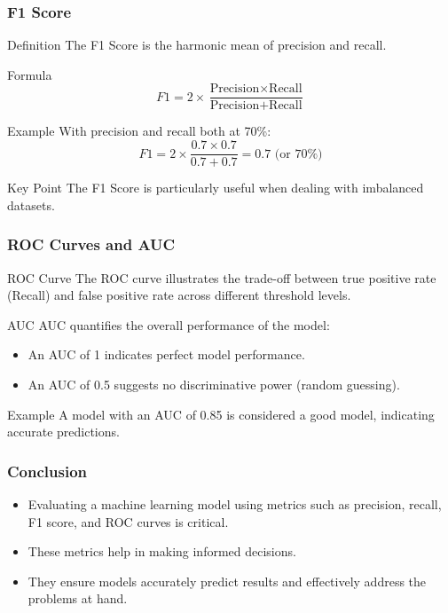 \documentclass[aspectratio=169]{beamer}
\begin{document}
\begin{frame}[fragile]
    \frametitle{F1 Score}
    \begin{block}{Definition}
        The F1 Score is the harmonic mean of precision and recall.
    \end{block}
    \begin{block}{Formula}
        \begin{equation}
            F1 = 2 \times \frac{\text{Precision} \times \text{Recall}}{\text{Precision} + \text{Recall}}
        \end{equation}
    \end{block}
    \begin{block}{Example}
        With precision and recall both at 70\%:
        \begin{equation}
            F1 = 2 \times \frac{0.7 \times 0.7}{0.7 + 0.7} = 0.7 \text{ (or 70\%)}
        \end{equation}
    \end{block}
    \begin{block}{Key Point}
        The F1 Score is particularly useful when dealing with imbalanced datasets.
    \end{block}
\end{frame}

\begin{frame}[fragile]
    \frametitle{ROC Curves and AUC}
    \begin{block}{ROC Curve}
        The ROC curve illustrates the trade-off between true positive rate (Recall) and false positive rate across different threshold levels.
    \end{block}
    \begin{block}{AUC}
        AUC quantifies the overall performance of the model:
        \begin{itemize}
            \item An AUC of 1 indicates perfect model performance.
            \item An AUC of 0.5 suggests no discriminative power (random guessing).
        \end{itemize}
    \end{block}
    \begin{block}{Example}
        A model with an AUC of 0.85 is considered a good model, indicating accurate predictions.
    \end{block}
\end{frame}

\begin{frame}[fragile]
    \frametitle{Conclusion}
    \begin{itemize}
        \item Evaluating a machine learning model using metrics such as precision, recall, F1 score, and ROC curves is critical.
        \item These metrics help in making informed decisions.
        \item They ensure models accurately predict results and effectively address the problems at hand.
    \end{itemize}
\end{frame}
\end{document}
